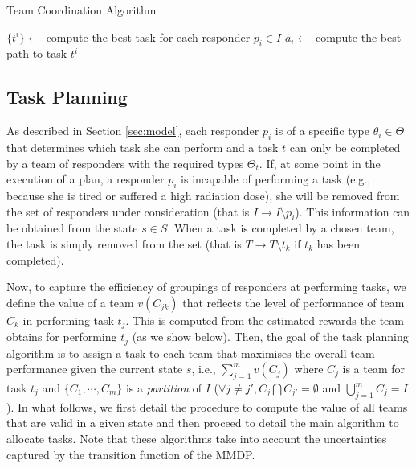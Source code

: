 \begin{algorithm}[t]
  \caption{Team Coordination Algorithm}\small
  \label{alg:coordination}
  \Indm
  \Indp\BlankLine
  $\{ t^i \} \gets$ compute the best task for each responder $p_i\in I$ \;
   {
    $a_i \gets$ compute the best path to task $t^i$ \;
  }
  \vspace{-1mm}
\end{algorithm}


\subsection{Task Planning}
\label{sec:taskplanning}
\noindent As described in Section \ref{sec:model}, each responder
$p_i$ is of a specific type $\theta_i \in \Theta$ that determines which task
she can perform and  a task $t$ can only be completed by a team of
responders with the required types $\Theta_t$. If, at some point in
the execution of a plan, a responder $p_i$ is incapable of
performing a task (e.g., because she is tired or suffered a high
radiation dose), she will be removed from the set of responders
under consideration (that is $I \to I \setminus p_i$). This
information can be obtained from the state $s \in S$. When a task
is completed by a chosen team, the task is simply removed from the
set (that is $T \to T\setminus t_k$ if $t_k$ has been completed).

Now, to capture the efficiency of groupings of responders at
performing tasks, we define the value
of a team $v(C_{jk})$ that reflects the level of performance of
team $C_k$ in performing task $t_j$. This is computed from the estimated rewards the team obtains for performing $t_j$ (as we show below).  Then, the goal of the task
planning algorithm is to assign a task to each team that maximises
the overall team performance given the current state $s$, i.e.,
$\sum_{j=1}^m v(C_{j})$ where $C_j$ is a team for task $t_j$ and $\{
C_1, \cdots, C_m \}$ is a {\em partition} of $I$ ($\forall j\neq
j', C_j \bigcap C_{j'} = \emptyset$ and $\bigcup_{j=1}^m C_j=I$).
In what follows, we first detail the procedure to compute the value
of all teams that are valid in a given state and then proceed to
detail the main algorithm to allocate tasks. Note that these
algorithms take into account the uncertainties captured by the
transition function of the MMDP.


